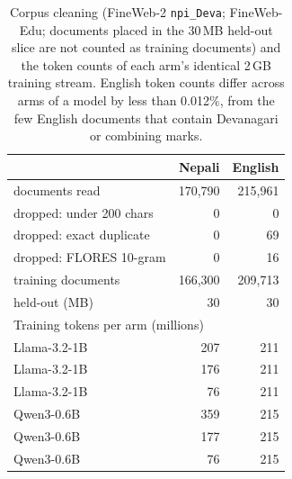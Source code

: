 \begin{table}[t]
\centering\small
\setlength{\tabcolsep}{3.5pt}
\begin{tabular}{lrr}
\toprule
& Nepali & English \\
\midrule
documents read & 170,790 & 215,961 \\
dropped: under 200 chars & 0 & 0 \\
dropped: exact duplicate & 0 & 69 \\
dropped: FLORES 10-gram & 0 & 16 \\
training documents & 166,300 & 209,713 \\
held-out (MB) & 30 & 30 \\
\midrule
\multicolumn{3}{l}{Training tokens per arm (millions)}\\
Llama-3.2-1B \RO{} & 207 & 211 \\
Llama-3.2-1B \RI{} & 176 & 211 \\
Llama-3.2-1B \RII{} & 76 & 211 \\
Qwen3-0.6B \RO{} & 359 & 215 \\
Qwen3-0.6B \RI{} & 177 & 215 \\
Qwen3-0.6B \RII{} & 76 & 215 \\
\bottomrule
\end{tabular}
\caption{Corpus cleaning (FineWeb-2 \texttt{npi\_Deva}; FineWeb-Edu; documents placed in the 30\,MB held-out slice are not counted as training documents) and the token counts of each arm's identical 2\,GB training stream. English token counts differ across arms of a model by less than 0.012\%, from the few English documents that contain Devanagari or combining marks.}
\label{tab:data}
\end{table}
